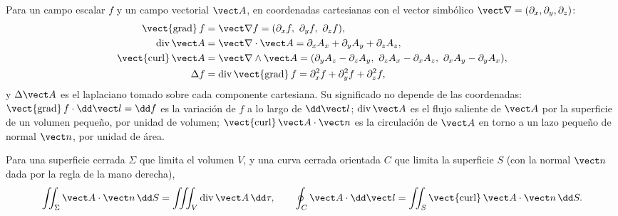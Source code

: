 \begin{definition}\label{def:b2:maxwell-equations:operators}
Para un campo escalar $f$ y un campo vectorial $\vect A$, en coordenadas
cartesianas con el vector simbólico $\vect\nabla = (\partial_x, \partial_y,
\partial_z)$:
\begin{align*}
\operatorname{\vect{grad}}f &= \vect\nabla f = (\partial_xf,\ \partial_yf,\ \partial_zf) ,\\
\operatorname{div}\vect A &= \vect\nabla\cdot\vect A = \partial_xA_x + \partial_yA_y + \partial_zA_z ,\\
\operatorname{\vect{curl}}\vect A &= \vect\nabla\wedge\vect A = (\partial_yA_z - \partial_zA_y,\ \partial_zA_x - \partial_xA_z,\ \partial_xA_y - \partial_yA_x) ,\\
\Delta f &= \operatorname{div}\operatorname{\vect{grad}}f = \partial_x^2f + \partial_y^2f + \partial_z^2f ,
\end{align*}
y $\Delta\vect A$ es el laplaciano tomado sobre cada componente cartesiana.
Su significado no depende de las coordenadas: $\operatorname{\vect{grad}}f
\cdot\dd\vect l = \dd f$ es la variación de $f$ a lo largo de $\dd\vect l$; $\operatorname{div}
\vect A$ es el flujo saliente de $\vect A$ por la superficie de un volumen
pequeño, por unidad de volumen; $\operatorname{\vect{curl}}\vect A\cdot\vect n$ es la
circulación de $\vect A$ en torno a un lazo pequeño de normal $\vect n$, por
unidad de área.
\end{definition}

\begin{theorem}\label{thm:b2:maxwell-equations:theorems}
Para una superficie cerrada $\Sigma$ que limita el volumen $V$, y una curva
cerrada orientada $C$ que limita la superficie $S$ (con la normal $\vect n$
dada por la regla de la mano derecha),
\[
\iint_\Sigma\vect A\cdot\vect n\,\dd S = \iiint_V\operatorname{div}\vect A\,\dd\tau ,
\qquad
\oint_C\vect A\cdot\dd\vect l = \iint_S\operatorname{\vect{curl}}\vect A\cdot\vect n\,\dd S .
\]
\end{theorem}
\admitted

